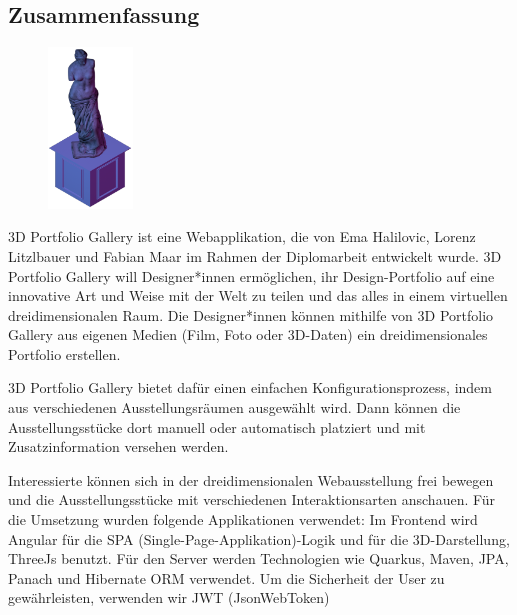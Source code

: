 \newpage
\begin{spacing}{1}
    \chapter*{Zusammenfassung}
\end{spacing}
\begin{figure}
    \begin{center}
      \includegraphics[width=0.2\textwidth]{pics/statue.png}
    \end{center}
\end{figure}
3D Portfolio Gallery ist eine Webapplikation, die von Ema Halilovic, Lorenz Litzlbauer und Fabian Maar im Rahmen der Diplomarbeit entwickelt wurde. 3D Portfolio Gallery will Designer*innen ermöglichen, ihr Design-Portfolio auf eine innovative Art und Weise mit der Welt zu teilen und das alles in einem virtuellen dreidimensionalen Raum. Die Designer*innen können mithilfe von 3D Portfolio Gallery aus eigenen Medien (Film, Foto oder 3D-Daten) ein dreidimensionales Portfolio erstellen.

3D Portfolio Gallery bietet dafür einen einfachen Konfigurationsprozess, indem aus verschiedenen Ausstellungsräumen ausgewählt wird. Dann können die Ausstellungsstücke dort manuell oder automatisch platziert und mit Zusatzinformation versehen werden.

Interessierte können sich in der dreidimensionalen Webausstellung frei bewegen und die Ausstellungsstücke mit verschiedenen Interaktionsarten anschauen.
Für die Umsetzung wurden folgende Applikationen verwendet: Im Frontend wird Angular für die SPA (Single-Page-Applikation)-Logik und für die 3D-Darstellung, ThreeJs benutzt. Für den Server werden Technologien wie Quarkus, Maven, JPA, Panach und  Hibernate ORM verwendet. Um die Sicherheit der User zu gewährleisten, verwenden wir JWT (JsonWebToken)
